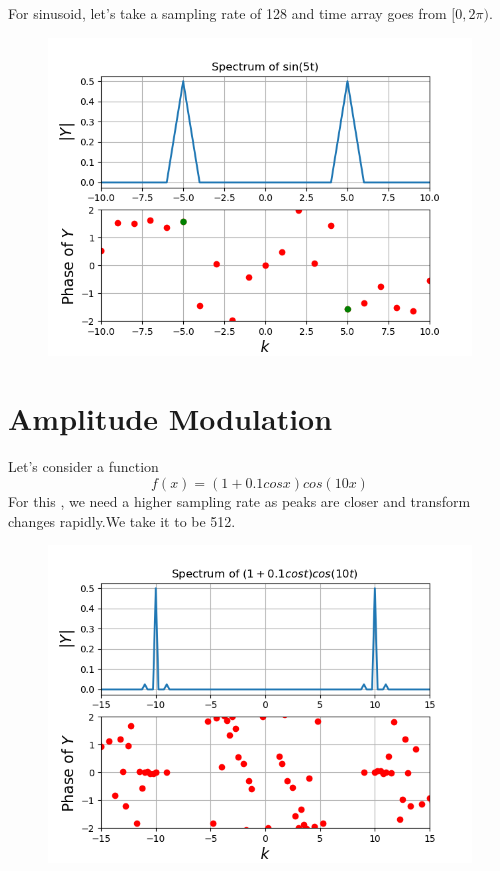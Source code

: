 \documentclass[12pt, a4paper]{report}
\begin{document}
For sinusoid, let's take a sampling rate of 128 and time array goes from $[0 ,2\pi)$. 
\begin{figure}[!tbh]
   	\centering
   	\includegraphics[scale=0.8]{Q1a.png}
 \end{figure} 
 
 \section*{Amplitude Modulation}
 Let's consider a function
 \begin{equation}
	f(x) = (1+0.1cosx)cos(10x)
\end{equation}
 For this , we need a higher sampling rate as peaks are closer and transform changes rapidly.We take it to be 512.
 \begin{figure}[!tbh]
   	\centering
   	\includegraphics[scale=0.8]{Q1b.png}
 \end{figure} 
 \newpage
\end{document}
